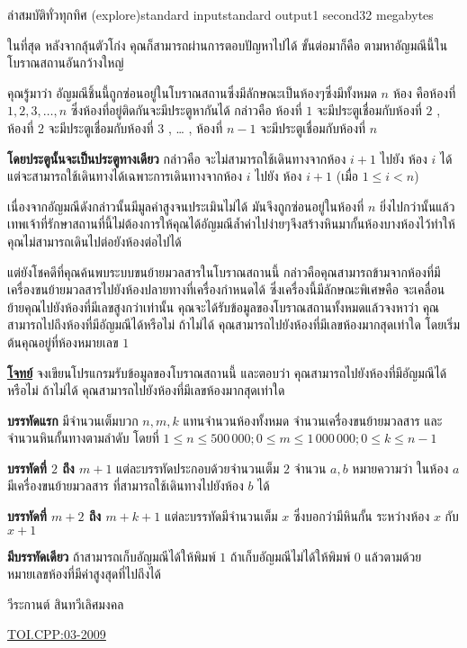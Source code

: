\documentclass[11pt,a4paper]{article}
\begin{document}
\begin{problem}{ล่าสมบัติทั่วทุกทิศ (explore)}{standard input}{standard output}{1 second}{32 megabytes}

ในที่สุด หลังจากลุ้นตัวโก่ง คุณก็สามารถผ่านการตอบปัญหาไปได้ ขั้นต่อมาก็คือ ตามหาอัญมณีนี้ในโบราณสถานอันกว้างใหญ่
         
          คุณรู้มาว่า อัญมณีชิ้นนี้ถูกซ่อนอยู่ในโบราณสถานซึ่งมีลักษณะเป็นห้องๆซึ่งมีทั้งหมด $n$ ห้อง คือห้องที่ $1,2,3,…,n$ ซึ่งห้องที่อยู่ติดกันจะมีประตูหากันได้ กล่าวคือ ห้องที่ $1$ จะมีประตูเชื่อมกับห้องที่ $2$ , ห้องที่ $2$ จะมีประตูเชื่อมกับห้องที่ $3$ , … , ห้องที่ $n-1$ จะมีประตูเชื่อมกับห้องที่ $n$

          \textbf{โดยประตูนั้นจะเป็นประตูทางเดียว} กล่าวคือ จะไม่สามารถใช้เดินทางจากห้อง $i+1$ ไปยัง ห้อง $i$ ได้ แต่จะสามารถใช้เดินทางได้เฉพาะการเดินทางจากห้อง $i$ ไปยัง ห้อง $i+1$ (เมื่อ $1 \leq i < n$)

          เนื่องจากอัญมณีดังกล่าวนั้นมีมูลค่าสูงจนประเมินไม่ได้ มันจึงถูกซ่อนอยู่ในห้องที่ $n$ ยิ่งไปกว่านั้นแล้ว เทพเจ้าที่รักษาสถานที่นี้ไม่ต้องการให้คุณได้อัญมณีล้ำค่าไปง่ายๆจึงสร้างหินมากั้นห้องบางห้องไว้ทำให้คุณไม่สามารถเดินไปต่อยังห้องต่อไปได้

          แต่ยังโชคดีที่คุณค้นพบระบบขนย้ายมวลสารในโบราณสถานนี้ กล่าวคือคุณสามารถข้ามจากห้องที่มีเครื่องขนย้ายมวลสารไปยังห้องปลายทางที่เครื่องกำหนดได้ ซึ่งเครื่องนี้มีลักษณะพิเศษคือ จะเคลื่อนย้ายคุณไปยังห้องที่มีเลขสูงกว่าเท่านั้น คุณจะได้รับข้อมูลของโบราณสถานทั้งหมดแล้วจงหาว่า คุณสามารถไปถึงห้องที่มีอัญมณีได้หรือไม่ ถ้าไม่ได้ คุณสามารถไปยังห้องที่มีเลขห้องมากสุดเท่าใด โดยเริ่มต้นคุณอยู่ที่ห้องหมายเลข $1$

\bigskip
\underline{\textbf{โจทย์}}  จงเขียนโปรแกรมรับข้อมูลของโบราณสถานนี้ และตอบว่า คุณสามารถไปยังห้องที่มีอัญมณีได้หรือไม่ ถ้าไม่ได้ คุณสามารถไปยังห้องที่มีเลขห้องมากสุดเท่าใด

\InputFile

\textbf{บรรทัดแรก} มีจำนวนเต็มบวก $n, m, k$ แทนจำนวนห้องทั้งหมด จำนวนเครื่องขนย้ายมวลสาร และ จำนวนหินกั้นทางตามลำดับ โดยที่ $1 \leq n \leq 500\,000; 0 \leq m \leq 1\,000\,000; 0 \leq k \leq n-1$

\textbf{บรรทัดที่ $2$ ถึง $m+1$} แต่ละบรรทัดประกอบด้วยจำนวนเต็ม $2$ จำนวน $a, b$ หมายความว่า ในห้อง $a$  มีเครื่องขนย้ายมวลสาร ที่สามารถใช้เดินทางไปยังห้อง $b$ ได้

\textbf{บรรทัดที่ $m+2$ ถึง $m+k+1$} แต่ละบรรทัดมีจำนวนเต็ม $x$ ซึ่งบอกว่ามีหินกั้น ระหว่างห้อง $x$ กับ $x + 1$


\OutputFile

\textbf{มีบรรทัดเดียว} ถ้าสามารถเก็บอัญมณีได้ให้พิมพ์ $1$ ถ้าเก็บอัญมณีไม่ได้ให้พิมพ์ $0$ แล้วตามด้วยหมายเลขห้องที่มีค่าสูงสุดที่ไปถึงได้

\Examples

\begin{example}
%
%
\end{example}


\Source

วีระกานต์ สินทวีเลิศมงคล

\underline{\href{http://www.thailandoi.org/toi.c/03-2009}{TOI.CPP:03-2009}}


\end{problem}
\end{document}
